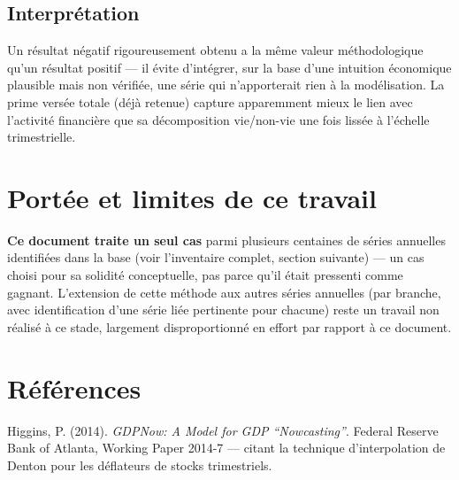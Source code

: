\documentclass[11pt,a4paper]{article}
\begin{document}
\subsection{Interprétation}

\begin{noteboxbleu}
Un résultat négatif rigoureusement obtenu a la même valeur méthodologique qu'un résultat positif --- il évite d'intégrer, sur la base d'une intuition économique plausible mais non vérifiée, une série qui n'apporterait rien à la modélisation. La prime versée totale (déjà retenue) capture apparemment mieux le lien avec l'activité financière que sa décomposition vie/non-vie une fois lissée à l'échelle trimestrielle.
\end{noteboxbleu}

\section{Portée et limites de ce travail}

\begin{fichebox}
\textbf{Ce document traite un seul cas} parmi plusieurs centaines de séries annuelles identifiées dans la base (voir l'inventaire complet, section suivante) --- un cas choisi pour sa solidité conceptuelle, pas parce qu'il était pressenti comme gagnant. L'extension de cette méthode aux autres séries annuelles (par branche, avec identification d'une série liée pertinente pour chacune) reste un travail non réalisé à ce stade, largement disproportionné en effort par rapport à ce document.
\end{fichebox}

\section*{Références}
\begin{enumerate}[leftmargin=1.6em, label=\textbf{[\arabic*]}]
\item \hypertarget{ref1}{} Higgins, P. (2014). \textit{GDPNow: A Model for GDP ``Nowcasting''}. Federal Reserve Bank of Atlanta, Working Paper 2014-7 --- citant la technique d'interpolation de Denton pour les déflateurs de stocks trimestriels.
\end{enumerate}
\end{document}
